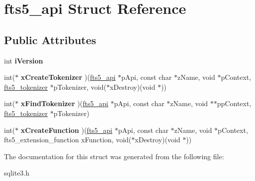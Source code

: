 \hypertarget{structfts5__api}{}\section{fts5\+\_\+api Struct Reference}
\label{structfts5__api}
\subsection*{Public Attributes}
\begin{DoxyCompactItemize}
\item 
\mbox{\label{structfts5__api_a3c338289abb33e1805da870172956a7c}} 
int {\bfseries i\+Version}
\item 
\mbox{\label{structfts5__api_a7fe3663f85eab512d5c461e1674da129}} 
int($\ast$ {\bfseries x\+Create\+Tokenizer} )(\mbox{\hyperlink{structfts5__api}{fts5\+\_\+api}} $\ast$p\+Api, const char $\ast$z\+Name, void $\ast$p\+Context, \mbox{\hyperlink{structfts5__tokenizer}{fts5\+\_\+tokenizer}} $\ast$p\+Tokenizer, void($\ast$x\+Destroy)(void $\ast$))
\item 
\mbox{\label{structfts5__api_a20a23794695fa61e2892ad1243b16b67}} 
int($\ast$ {\bfseries x\+Find\+Tokenizer} )(\mbox{\hyperlink{structfts5__api}{fts5\+\_\+api}} $\ast$p\+Api, const char $\ast$z\+Name, void $\ast$$\ast$pp\+Context, \mbox{\hyperlink{structfts5__tokenizer}{fts5\+\_\+tokenizer}} $\ast$p\+Tokenizer)
\item 
\mbox{\label{structfts5__api_acf1a0612be3b91b908f38ecbc6735d17}} 
int($\ast$ {\bfseries x\+Create\+Function} )(\mbox{\hyperlink{structfts5__api}{fts5\+\_\+api}} $\ast$p\+Api, const char $\ast$z\+Name, void $\ast$p\+Context, fts5\+\_\+extension\+\_\+function x\+Function, void($\ast$x\+Destroy)(void $\ast$))
\end{DoxyCompactItemize}


The documentation for this struct was generated from the following file\+:\begin{DoxyCompactItemize}
\item 
sqlite3.\+h\end{DoxyCompactItemize}
